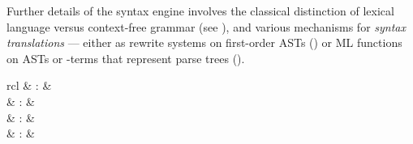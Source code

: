 \begin{isabellebody}
\begin{isamarkuptext}
  Further details of the syntax engine involves the classical
  distinction of lexical language versus context-free grammar (see
  ), and various mechanisms for \emph{syntax
  translations} --- either as rewrite systems on first-order ASTs
  () or ML functions on ASTs or -terms that represent parse trees ().%
\end{isamarkuptext}%
\isamarkuptrue%
%
\isamarkuptrue%
%
\isamarkuptrue%
%
\begin{isamarkuptext}%
\begin{matharray}{rcl}
    \hypertarget{command.typ}{\hyperlink{command.typ}{\mbox{}}} & : &  \\
    \hypertarget{command.term}{\hyperlink{command.term}{\mbox{}}} & : &  \\
    \hypertarget{command.prop}{\hyperlink{command.prop}{\mbox{}}} & : &  \\
    \hypertarget{command.thm}{\hyperlink{command.thm}{\mbox{}}} & : &  \\

\end{matharray}
\end{isamarkuptext}
\end{isabellebody}
